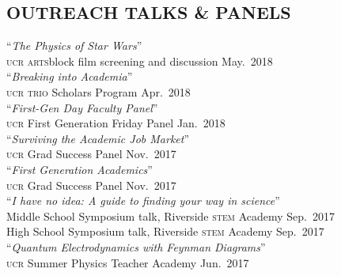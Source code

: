 \documentclass[margin,line]{resume}
\newcommand{\mytalksep}{-.1mm}
\newcommand{\mytalkskip}{2mm}
\newcommand{\scap}[1]{\textsc{\MakeLowercase{#1}}}
\begin{document}
\begin{resume}
\section{\footnotesize \sc
\sffamily 
{}OUTREACH TALKS \& PANELS
}

``\emph{The Physics of Star Wars}''\vspace{\mytalksep}\\ 
\scap{UCR} \scap{ARTS}block film screening and discussion \hfill May.~{2018}\vspace{\mytalkskip}\\ 
``\emph{Breaking into Academia}''\vspace{\mytalksep}\\ 
\scap{UCR} \scap{TRIO} Scholars Program \hfill Apr.~{2018}\vspace{\mytalkskip}\\ 
%
``\emph{First-Gen Day Faculty Panel}''\vspace{\mytalksep}\\ 
\scap{UCR} First Generation Friday Panel \hfill Jan.~{2018}\vspace{\mytalkskip}\\ 
%
``\emph{Surviving the Academic Job Market}''\vspace{\mytalksep}\\ 
\scap{UCR} Grad Success Panel \hfill Nov.~{2017}\vspace{\mytalkskip}\\ 
%
``\emph{First Generation Academics}''\vspace{\mytalksep}\\ 
\scap{UCR} Grad Success Panel \hfill Nov.~{2017}\vspace{\mytalkskip}\\ 
%
``\emph{I have no idea: A guide to finding your way in science}''\vspace{\mytalksep}\\ 
Middle School Symposium talk, Riverside \scap{STEM} Academy \hfill Sep.~{2017}\vspace{\mytalksep}\\ 
High School Symposium talk, Riverside \scap{STEM} Academy 
\hfill Sep.~{2017}\vspace{\mytalkskip}\\ 
%
``\emph{Quantum Electrodynamics with Feynman Diagrams}''\vspace{\mytalksep}\\ 
\scap{UCR} Summer Physics Teacher Academy \hfill Jun.~{2017}\vspace{\mytalkskip}\\ 

\end{resume}
\end{document}
